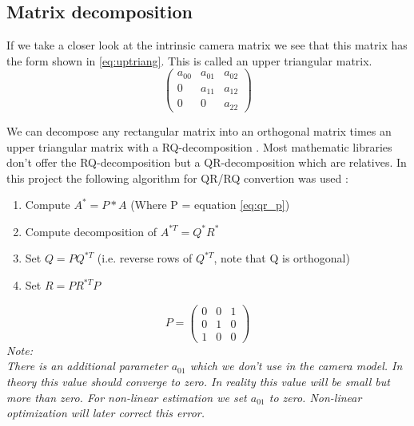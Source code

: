 \documentclass[11pt,a4paper,titlepage,oneside]{report}
\begin{document}
\subsection{Matrix decomposition}\label{sec:matrix_dec}
If we take a closer look at the intrinsic camera matrix we see that this matrix has the form shown in \ref{eq:uptriang}. This is called an upper triangular matrix.
\begin{equation}\label{eq:uptriang}
	\begin{pmatrix}
		a_{00} & a_{01} & a_{02}\\
		0 & a_{11} & a_{12}\\
		0 & 0 & a_{22}
	\end{pmatrix}
\end{equation}

We can decompose any rectangular matrix into an orthogonal matrix times an upper triangular matrix with a RQ-decomposition \cite{qr_decomposition}. Most mathematic libraries don't offer the RQ-decomposition but a QR-decomposition which are relatives. In this project the following algorithm for QR/RQ convertion was used \cite{rq_stack}:
\begin{enumerate}
	\item Compute $A^{*}=P*A$ (Where P = equation \ref{eq:qr_p})
	\item Compute decomposition of $A^{*T}=Q^*R^*$
	\item Set $Q=PQ^{*T}$ (i.e. reverse rows of $Q^{*T}$, note that Q is orthogonal)
	\item Set $R=PR^{*T}P$
\end{enumerate}

\begin{equation}\label{eq:qr_p}
	P=\begin{pmatrix}
		0 & 0 & 1\\
		0 & 1 & 0\\
		1 & 0 & 0
	\end{pmatrix}
\end{equation}
\em
Note:\\
There is an additional parameter $a_{01}$ which we don't use in the camera model. In theory this value should converge to zero. In reality this value will be small but more than zero. For non-linear estimation we set $a_{01}$ to zero. Non-linear optimization will later correct this error.
\normalfont
\end{document}
